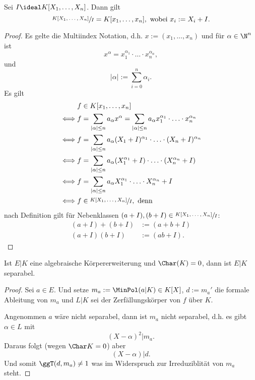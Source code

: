 \begin{erinnerung}
    Sei $I \ideal K[X_1, \ldots, X_n]$. Dann gilt
    $$ \sfrac{K[X_1, \ldots, X_n]}{I} = K[x_1, \ldots, x_n], \text{ wobei } x_i := X_i + I. $$
\end{erinnerung}
\begin{proof}
    Es gelte die Multiindex Notation, d.h. $x := (x_1, \ldots, x_n)$ und für $\alpha \in \N^n$ ist
    $$ x^\alpha = x_1^{\alpha_1}\cdot \ldots\cdot x_n^{\alpha_n}, $$
    und
    $$ | \alpha| := \sum_{i=0}^n \alpha_i .$$
    Es gilt
    \begin{align*}
        & f \in K[x_1, \ldots, x_n]\\
        \iff & f = \sum_{|\alpha| \leq n} a_\alpha x^\alpha = \sum_{|\alpha| \leq n} a_\alpha x_1^{\alpha_1}\cdot \ldots \cdot x_n^{\alpha_n}\\
        \iff & f = \sum_{|\alpha| \leq n} a_\alpha (X_1 + I)^{\alpha_1}\cdot \ldots \cdot (X_n + I)^{\alpha_n}\\
        \iff & f = \sum_{|\alpha| \leq n} a_\alpha (X_1^{\alpha_1} + I)\cdot \ldots \cdot (X_n^{\alpha_n} +I)\\
        \iff & f = \sum_{|\alpha| \leq n} a_\alpha X_1^{\alpha_1}\cdot \ldots \cdot X_n^{\alpha_n} + I\\
        \iff &f \in \sfrac{K[X_1, \ldots, X_n]}{I}, \text{ denn}
    \end{align*}
    nach Definition gilt für Nebenklassen $(a + I),(b + I) \in \sfrac{K[X_1, \ldots, X_n]}{I}$:
    \begin{align*}
        (a + I) + (b + I) &:= (a+b + I)\\
        (a + I)(b + I) &:= (ab + I).
    \end{align*}
\end{proof}

\begin{erinnerung}
    Ist $E|K$ eine algebraische Körpererweiterung und $\Char (K) = 0$, dann ist $E|K$ separabel.
\end{erinnerung}
\begin{proof}
    Sei $a \in E$. Und setze $m_a := \MinPol(a|K) \in K[X]$, $d := m_a'$ die formale Ableitung von $m_a$
    und $L|K$ sei der Zerfällungskörper von $f$ über $K$.

    Angenommen $a$ wäre nicht separabel, dann ist $m_a$ nicht separabel, d.h. es gibt $\alpha \in L$ mit
    $$ (X - \alpha)^2 | m_a. $$
    Daraus folgt (wegen $\Char K = 0$) aber
    $$ (X - \alpha) | d.$$
    Und somit $\ggT(d, m_a) \ne 1$
    was im Widerspruch zur Irreduziblität von $m_a$ steht.
\end{proof}

